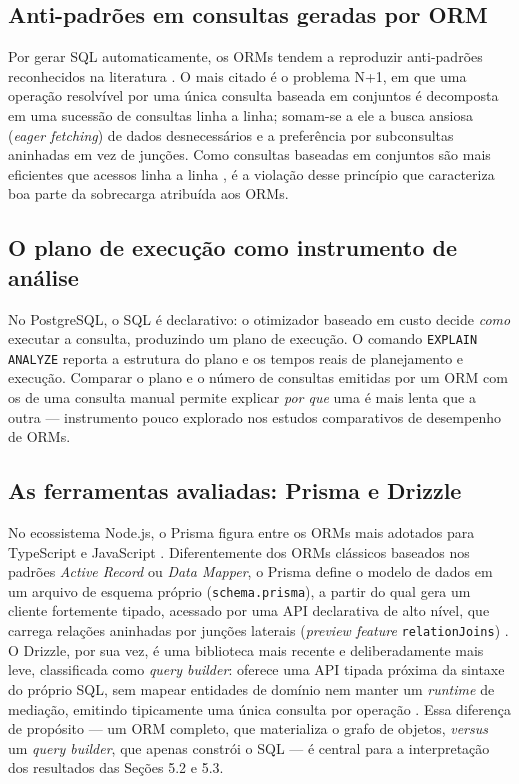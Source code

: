 \documentclass[12pt]{article}
\begin{document}
\subsection{Anti-padrões em consultas geradas por ORM}

Por gerar SQL automaticamente, os ORMs tendem a reproduzir anti-padrões
reconhecidos na literatura \cite{colley2020}. O mais citado é o problema
N+1, em que uma operação resolvível por uma única consulta baseada em
conjuntos é decomposta em uma sucessão de consultas linha a linha;
somam-se a ele a busca ansiosa (\textit{eager fetching}) de dados
desnecessários e a preferência por subconsultas aninhadas em vez de
junções. Como consultas baseadas em conjuntos são mais eficientes que
acessos linha a linha \cite{colley2020}, é a violação desse princípio que
caracteriza boa parte da sobrecarga atribuída aos ORMs.

\subsection{O plano de execução como instrumento de análise}

No PostgreSQL, o SQL é declarativo: o otimizador baseado em custo decide
\textit{como} executar a consulta, produzindo um plano de execução. O
comando \texttt{EXPLAIN ANALYZE} reporta a estrutura do plano e os tempos
reais de planejamento e execução. Comparar o plano e o número de
consultas emitidas por um ORM com os de uma consulta manual permite
explicar \textit{por que} uma é mais lenta que a outra --- instrumento
pouco explorado nos estudos comparativos de desempenho de ORMs.

\subsection{As ferramentas avaliadas: Prisma e Drizzle}

No ecossistema Node.js, o Prisma figura entre os ORMs mais adotados para
TypeScript e JavaScript \cite{oliveira2024}. Diferentemente dos ORMs
clássicos baseados nos padrões \textit{Active Record} ou \textit{Data
Mapper}, o Prisma define o modelo de dados em um arquivo de esquema
próprio (\texttt{schema.prisma}), a partir do qual gera um cliente
fortemente tipado, acessado por uma API declarativa de alto nível, que
carrega relações aninhadas por junções laterais (\textit{preview feature}
\texttt{relationJoins}) \cite{prisma2025}. O Drizzle, por sua vez, é uma
biblioteca mais recente e deliberadamente mais leve, classificada como
\textit{query builder}: oferece uma API tipada próxima da sintaxe do
próprio SQL, sem mapear entidades de domínio nem manter um
\textit{runtime} de mediação, emitindo tipicamente uma única consulta
por operação \cite{drizzle2025}. Essa diferença de propósito --- um ORM
completo, que materializa o grafo de objetos, \textit{versus} um
\textit{query builder}, que apenas constrói o SQL --- é central para a
interpretação dos resultados das Seções 5.2 e 5.3.
\end{document}
